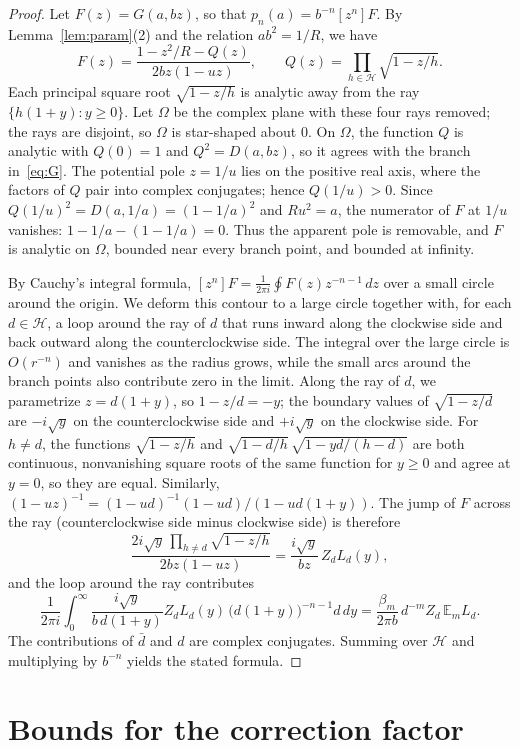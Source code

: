 \documentclass[11pt]{amsart}
\theoremstyle{remark}
\newcommand{\E}{\mathbb{E}}
\begin{document}
\begin{proof}
Let $F(z)=G(a,bz)$, so that $p_n(a)=b^{-n}[z^n]F$. By
Lemma~\ref{lem:param}(2) and the relation $ab^2=1/R$, we have
\[
 F(z)=\frac{1-z^2/R-Q(z)}{2bz(1-uz)},\qquad Q(z)=\prod_{h\in\mathcal H}\sqrt{1-z/h}.
\]
Each principal square root $\sqrt{1-z/h}$ is analytic away from the ray
$\{h(1+y):y\ge0\}$. Let $\Omega$ be the complex plane with these four rays
removed; the rays are disjoint, so $\Omega$ is star-shaped about $0$. On
$\Omega$, the function $Q$ is analytic with $Q(0)=1$ and $Q^2=D(a,bz)$, so
it agrees with the branch in~\eqref{eq:G}. The potential pole $z=1/u$ lies
on the positive real axis, where the factors of $Q$ pair into complex
conjugates; hence $Q(1/u)>0$. Since $Q(1/u)^2=D(a,1/a)=(1-1/a)^2$ and
$Ru^2=a$, the numerator of $F$ at $1/u$ vanishes: $1-1/a-(1-1/a)=0$. Thus
the apparent pole is removable, and $F$ is analytic on $\Omega$, bounded
near every branch point, and bounded at infinity.

By Cauchy's integral formula, $[z^n]F=\frac1{2\pi i}\oint F(z)z^{-n-1}\,dz$
over a small circle around the origin. We deform this contour to a large
circle together with, for each $d\in\mathcal H$, a loop around the ray of
$d$ that runs inward along the clockwise side and back outward along the
counterclockwise side. The integral over the large circle is $O(r^{-n})$ and
vanishes as the radius grows, while the small arcs around the branch points
also contribute zero in the limit. Along the ray of $d$, we parametrize
$z=d(1+y)$, so $1-z/d=-y$; the boundary values of $\sqrt{1-z/d}$ are
$-i\sqrt y$ on the counterclockwise side and $+i\sqrt y$ on the clockwise
side. For $h\ne d$, the functions $\sqrt{1-z/h}$ and
$\sqrt{1-d/h}\,\sqrt{1-yd/(h-d)}$ are both continuous, nonvanishing square
roots of the same function for $y\ge0$ and agree at $y=0$, so they are
equal. Similarly, $(1-uz)^{-1}=(1-ud)^{-1}(1-ud)/(1-ud(1+y))$. The jump of
$F$ across the ray (counterclockwise side minus clockwise side) is therefore
\[
 \frac{2i\sqrt y\,\prod_{h\ne d}\sqrt{1-z/h}}{2bz(1-uz)}=\frac{i\sqrt y}{bz}\,Z_dL_d(y),
\]
and the loop around the ray contributes
\[
 \frac1{2\pi i}\int_0^\infty\frac{i\sqrt y}{b\,d(1+y)}Z_dL_d(y)\,\bigl(d(1+y)\bigr)^{-n-1}d\,dy
 =\frac{\beta_m}{2\pi b}\,d^{-m}Z_d\,\E_mL_d .
\]
The contributions of $\bar d$ and $d$ are complex conjugates. Summing over
$\mathcal H$ and multiplying by $b^{-n}$ yields the stated formula.
\end{proof}

\section{Bounds for the correction factor}\label{sec:bounds}
\end{document}
